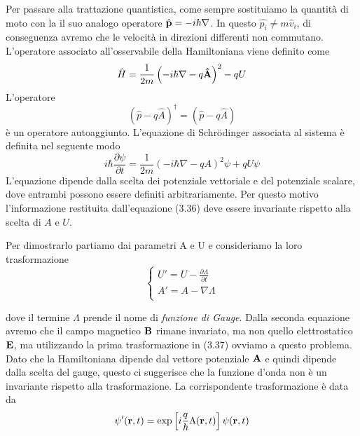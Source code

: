 Per passare alla trattazione quantistica, come sempre sostituiamo la quantit\`a di moto con la il suo analogo operatore $ \hat{\bold{p}} = - i \hbar \nabla $. In questo $\hat{p_i} \neq  m \hat{v}_i$, di conseguenza avremo che le velocit\`a in direzioni differenti non commutano. L'operatore associato all'osservabile della Hamiltoniana viene definito come 
\begin{equation*}
	\hat{H} = \frac{1}{2m} \left ( - i\hbar\nabla - q\bold{\hat{A}} \right)^2 - qU 
\end{equation*}
 L'operatore 
\begin{equation*}
	(\hat{p} - q \hat{A})^\dag = (\hat{p} - q \hat{A}) 
\end{equation*}
\`e un operatore autoaggiunto.
L'equazione di Schr\"odinger associata al sistema \`e definita nel seguente modo
\begin{equation}
	i\hbar \frac{\partial \psi }{\partial t} = \frac{1}{2m} (-i\hbar \nabla - qA)^2 \psi + qU\psi 
\end{equation}
L'equazione dipende dalla scelta dei potenziale vettoriale e del potenziale scalare, dove entrambi possono essere definiti arbitrariamente. Per questo motivo l'informazione restituita dall'equazione (3.36) deve essere invariante rispetto alla scelta di $A$ e $U.$ 
\newpage 

Per dimostrarlo partiamo dai parametri A e U e consideriamo la loro trasformazione 
\begin{equation}
	\left \{\begin{array}{l}
		U' = U - \frac{\partial \Lambda}{\partial t} \\ 
		A' =  A - \nabla \Lambda \\
	\end{array}\right.
\end{equation}

dove il termine $\Lambda$ prende il nome di \textit{funzione di Gauge}. Dalla seconda equazione avremo che il campo magnetico $\bold{B}$ rimane invariato, ma non quello elettrostatico $\bold{E}$, ma utilizzando la prima trasformazione in (3.37) ovviamo a questo problema. Dato che la Hamiltoniana dipende dal vettore potenziale $\bold{A}$ e quindi dipende dalla scelta del gauge, questo ci suggerisce che la funzione d'onda non \`e un invariante rispetto alla trasformazione. La corrispondente trasformazione \`e data da 
\begin{equation}
	\psi'(\bold{r},t) = \exp \left [i \frac{q}{\hbar} \Lambda(\bold{r},t) \right ]\psi(\bold{r},t)
\end{equation}

